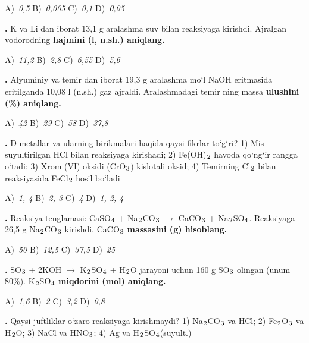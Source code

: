 \documentclass[11pt,a4paper]{article}
\renewcommand{\textsubscript}[1]{\ensuremath{_{\text{\fontsize{8}{8}\selectfont #1}}}}
\newcommand{\qn}[1]{\textbf{\fontsize{11.5}{13}\selectfont #1}}
\newcommand{\qsep}{\par\vspace{1pt}\noindent\rule{0pt}{0.4pt}\par\vspace{5pt}}
\begin{document}
\begin{multicols}{2}
\noindent A)~\textsl{0,5} \hfill B)~\textsl{0,005} \hfill C)~\textsl{0,1} \hfill D)~\textsl{0,05}\par
\qsep
\noindent\qn{14.} K va Li dan iborat 13,1 g aralashma suv bilan reaksiyaga kirishdi. Ajralgan vodorodning \textbf{hajmini (l, n.sh.) aniqlang.}

\noindent A)~\textsl{11,2} \hfill B)~\textsl{2,8} \hfill C)~\textsl{6,55} \hfill D)~\textsl{5,6}\par
\qsep
\noindent\qn{15.} Alyuminiy va temir dan iborat 19,3 g aralashma mo`l NaOH eritmasida eritilganda 10,08 l (n.sh.) gaz ajraldi. Aralashmadagi temir ning massa \textbf{ulushini (\%) aniqlang.}

\noindent A)~\textsl{42} \hfill B)~\textsl{29} \hfill C)~\textsl{58} \hfill D)~\textsl{37,8}\par
\qsep
\noindent\qn{16.} D-metallar va ularning birikmalari haqida qaysi fikrlar to`g`ri? 1) Mis suyultirilgan HCl bilan reaksiyaga kirishadi; 2) Fe(OH)\textsubscript{2} havoda qo`ng`ir rangga o`tadi; 3) Xrom (VI) oksidi (CrO\textsubscript{3}) kislotali oksid; 4) Temirning Cl\textsubscript{2} bilan reaksiyasida FeCl\textsubscript{2} hosil bo`ladi

\noindent A)~\textsl{1, 4} \hfill B)~\textsl{2, 3} \hfill C)~\textsl{4} \hfill D)~\textsl{1, 2, 4}\par
\qsep
\noindent\qn{17.} Reaksiya tenglamasi: CaSO\textsubscript{4} + Na\textsubscript{2}CO\textsubscript{3} $\to$ CaCO\textsubscript{3} + Na\textsubscript{2}SO\textsubscript{4}. Reaksiyaga 26,5 g Na\textsubscript{2}CO\textsubscript{3} kirishdi. CaCO\textsubscript{3} \textbf{massasini (g) hisoblang.}

\noindent A)~\textsl{50} \hfill B)~\textsl{12,5} \hfill C)~\textsl{37,5} \hfill D)~\textsl{25}\par
\qsep
\noindent\qn{18.} SO\textsubscript{3} + 2KOH $\to$ K\textsubscript{2}SO\textsubscript{4} + H\textsubscript{2}O jarayoni uchun 160 g SO\textsubscript{3} olingan (unum 80\%). K\textsubscript{2}SO\textsubscript{4} \textbf{miqdorini (mol) aniqlang.}

\noindent A)~\textsl{1,6} \hfill B)~\textsl{2} \hfill C)~\textsl{3,2} \hfill D)~\textsl{0,8}\par
\qsep
\noindent\qn{19.} Qaysi juftliklar o`zaro reaksiyaga kirishmaydi? 1) Na\textsubscript{2}CO\textsubscript{3} va HCl; 2) Fe\textsubscript{2}O\textsubscript{3} va H\textsubscript{2}O; 3) NaCl va HNO\textsubscript{3}; 4) Ag va H\textsubscript{2}SO\textsubscript{4}(suyult.)


\end{multicols}
\end{document}
